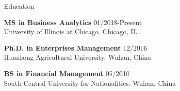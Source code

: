 \documentclass{resume} %
\begin{document}
\begin{minipage}[t]{0.33\textwidth} 


\begin{rSection}{Education}

{\bf MS in Business Analytics} \hfill {01/2018-Present}
\\ 
University of Illinois at Chicago. Chicago, IL   

{\bf Ph.D. in Enterprises Management} \hfill {12/2016}
\\ 
Huazhong Agricultural University. Wuhan, China

{\bf BS in Financial Management} \hfill {05/2010}
\\ 
South-Central University for Nationalities. Wuhan, China

\end{rSection}







\end{minipage} 
\hfill
\end{document}
